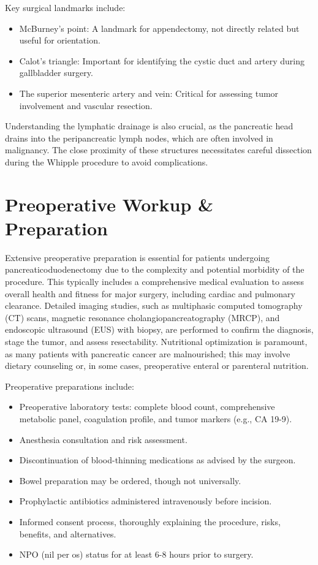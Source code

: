 Key surgical landmarks include:

\begin{itemize}
  \item McBurney's point: A landmark for appendectomy, not directly related but useful for orientation.
  \item Calot's triangle: Important for identifying the cystic duct and artery during gallbladder surgery.
  \item The superior mesenteric artery and vein: Critical for assessing tumor involvement and vascular resection.
\end{itemize}

Understanding the lymphatic drainage is also crucial, as the pancreatic head drains into the peripancreatic lymph nodes, which are often involved in malignancy. The close proximity of these structures necessitates careful dissection during the Whipple procedure to avoid complications.

\section*{Preoperative Workup \& Preparation}
Extensive preoperative preparation is essential for patients undergoing pancreaticoduodenectomy due to the complexity and potential morbidity of the procedure. This typically includes a comprehensive medical evaluation to assess overall health and fitness for major surgery, including cardiac and pulmonary clearance. Detailed imaging studies, such as multiphasic computed tomography (CT) scans, magnetic resonance cholangiopancreatography (MRCP), and endoscopic ultrasound (EUS) with biopsy, are performed to confirm the diagnosis, stage the tumor, and assess resectability. Nutritional optimization is paramount, as many patients with pancreatic cancer are malnourished; this may involve dietary counseling or, in some cases, preoperative enteral or parenteral nutrition.

Preoperative preparations include:

\begin{itemize}
  \item Preoperative laboratory tests: complete blood count, comprehensive metabolic panel, coagulation profile, and tumor markers (e.g., CA 19-9).
  \item Anesthesia consultation and risk assessment.
  \item Discontinuation of blood-thinning medications as advised by the surgeon.
  \item Bowel preparation may be ordered, though not universally.
  \item Prophylactic antibiotics administered intravenously before incision.
  \item Informed consent process, thoroughly explaining the procedure, risks, benefits, and alternatives.
  \item NPO (nil per os) status for at least 6-8 hours prior to surgery.
\end{itemize}

